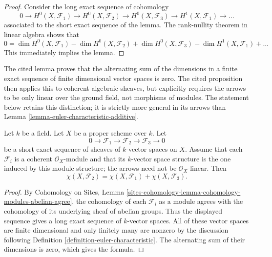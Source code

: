 \begin{proof}
Consider the long exact sequence of cohomology
$$
0 \to H^0(X, \mathcal{F}_1) \to H^0(X, \mathcal{F}_2) \to
H^0(X, \mathcal{F}_3) \to H^1(X, \mathcal{F}_1) \to \ldots
$$
associated to the short exact sequence of the lemma. The rank-nullity theorem
in linear algebra shows that
$$
0 = \dim H^0(X, \mathcal{F}_1) - \dim H^0(X, \mathcal{F}_2)
+ \dim H^0(X, \mathcal{F}_3) - \dim H^1(X, \mathcal{F}_1) + \ldots
$$
This immediately implies the lemma.
\end{proof}

\begin{lemma}
\label{lemma-euler-characteristic-additive-k-linear}
\begin{reference}
\cite[Chapter III, \S 6, no. 79, Lemma 1 and Proposition 1,
pp. 274--275]{FAC}
\end{reference}
\begin{history}
The cited lemma proves that the alternating sum of the dimensions in a finite
exact sequence of finite dimensional vector spaces is zero. The cited
proposition then applies this to coherent algebraic sheaves, but explicitly
requires the arrows to be only linear over the ground field, not morphisms of
modules. The statement below retains this distinction; it is strictly more
general in its arrows than Lemma
\ref{lemma-euler-characteristic-additive}.
\end{history}
Let $k$ be a field. Let $X$ be a proper scheme over $k$.
Let
$$
0 \to \mathcal{F}_1 \to \mathcal{F}_2 \to \mathcal{F}_3 \to 0
$$
be a short exact sequence of sheaves of $k$-vector spaces on $X$.
Assume that each $\mathcal{F}_i$ is a coherent $\mathcal{O}_X$-module and
that its $k$-vector space structure is the one induced by this module
structure; the arrows need not be $\mathcal{O}_X$-linear. Then
$$
\chi(X, \mathcal{F}_2) =
\chi(X, \mathcal{F}_1) + \chi(X, \mathcal{F}_3).
$$
\end{lemma}

\begin{proof}
By Cohomology on Sites, Lemma
\ref{sites-cohomology-lemma-cohomology-modules-abelian-agree}, the cohomology
of each $\mathcal{F}_i$ as a module agrees with the cohomology of its
underlying sheaf of abelian groups. Thus the displayed sequence gives a long
exact sequence of $k$-vector spaces. All of these vector spaces are finite
dimensional and only finitely many are nonzero by the discussion following
Definition \ref{definition-euler-characteristic}. The alternating sum of
their dimensions is zero, which gives the formula.
\end{proof}

